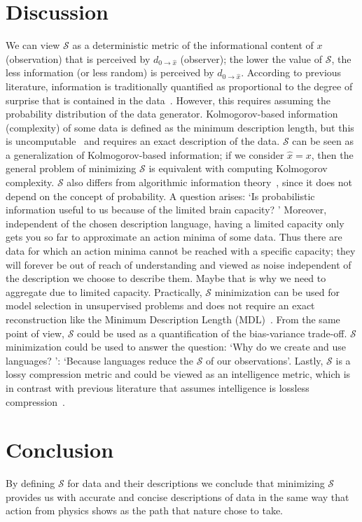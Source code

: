 \documentclass[twoside,11pt]{article}
\begin{document}
\section{Discussion}
We can view \(\mathcal{S}\) as a deterministic metric of the informational content of \(x\) (observation) that is perceived by \(d_{0 \rightarrow \hat{x}}\) (observer); the lower the value of \(\mathcal{S}\), the less information (or less random) is perceived by \(d_{0 \rightarrow \hat{x}}\). 
According to previous literature, information is traditionally quantified as proportional to the degree of surprise that is contained in the data~\cite{shannon1948mathematical}.
However, this requires assuming the probability distribution of the data generator.
Kolmogorov-based information (complexity) of some data is defined as the minimum description length, but this is uncomputable~\cite{li2008introduction} and requires an exact description of the data.
\(\mathcal{S}\) can be seen as a generalization of Kolmogorov-based information; if we consider \(\hat{x} = x\), then the general problem of minimizing \(\mathcal{S}\) is equivalent with computing Kolmogorov complexity.
\(\mathcal{S}\) also differs from algorithmic information theory~\cite{chaitin1977algorithmic}, since it does not depend on the concept of probability. 
A question arises: `Is probabilistic information useful to us because of the limited brain capacity? '
Moreover, independent of the chosen description language, having a limited capacity only gets you so far to approximate an action minima of some data.
Thus there are data for which an action minima cannot be reached with a specific capacity; they will forever be out of reach of understanding and viewed as noise independent of the description we choose to describe them.
Maybe that is why we need to aggregate due to limited capacity.
Practically, \(\mathcal{S}\) minimization can be used for model selection in unsupervised problems and does not require an exact reconstruction like the Minimum Description Length (MDL)~\cite{rissanen1983universal}.
From the same point of view, \(\mathcal{S}\) could be used as a quantification of the bias-variance trade-off. 
\(\mathcal{S}\) minimization could be used to answer the question: `Why do we create and use languages? ': `Because languages reduce the \(\mathcal{S}\) of our observations'.
Lastly, \(\mathcal{S}\) is a lossy compression metric and could be viewed as an intelligence metric, which is in contrast with previous literature that assumes intelligence is lossless compression~\cite{hutter2012human}.

\section{Conclusion}
By defining \(\mathcal{S}\) for data and their descriptions we conclude that minimizing \(\mathcal{S}\) provides us with accurate and concise descriptions of data in the same way that action from physics shows as the path that nature chose to take.


\end{document}
